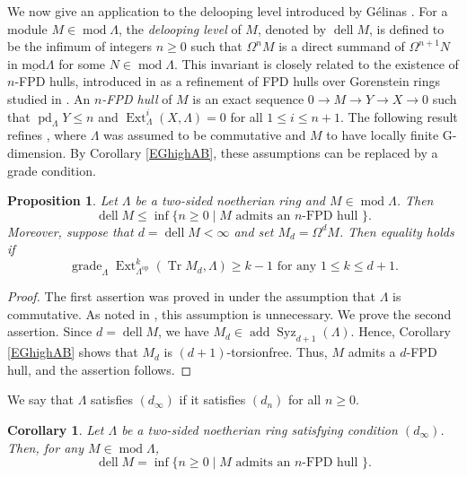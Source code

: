 \documentclass{amsart}
\newtheorem{prop}[thm]{Proposition}
\newtheorem{cor}[thm]{Corollary}
\theoremstyle{definition}
\theoremstyle{remark}
\numberwithin{equation}{thm}
\def\add{\operatorname{add}}
\def\dell{\operatorname{dell}}
\def\Ext{\operatorname{Ext}}
\def\ge{\geqslant}
\def\grade{\operatorname{grade}}
\def\le{\leqslant}
\def\lmod{\operatorname{\underline{mod}}}
\def\mod{\operatorname{mod}}
\def\pd{\operatorname{pd}}
\def\syz{\Omega}
\def\Syz{\operatorname{Syz}}
\def\tr{\operatorname{Tr}}
\begin{document}
We now give an application to the delooping level introduced by Gélinas \cite{Gel}. For a module $M\in\mod\Lambda$, the {\em delooping level} of $M$, denoted by $\dell M$, is defined to be the infimum of integers $n\ge0$ such that $\syz^n M$ is a direct summand of $\syz^{n+1}N$ in $\lmod\Lambda$ for some $N\in\mod\Lambda$. This invariant is closely related to the existence of $n$-FPD hulls, introduced in \cite{OExt, OMart} as a refinement of FPD hulls over Gorenstein rings studied in \cite{ABu}. An {\em $n$-FPD hull} of $M$ is an exact sequence $0\to M\to Y\to X\to0$ such that $\pd_\Lambda Y\le n$ and $\Ext^i_\Lambda(X,\Lambda)=0$ for all $1\le i\le n+1$. The following result refines \cite[Theorem 1.3]{OExt}, where $\Lambda$ was assumed to be commutative and $M$ to have locally finite G-dimension. By Corollary \ref{EGhighAB}, these assumptions can be replaced by a grade condition.

\begin{prop}\label{deloop}
Let $\Lambda$ be a two-sided noetherian ring and $M\in\mod\Lambda$. Then
$$
\dell M\le\inf\{n\ge0\mid M\text{ admits an }n\text{-FPD hull }\}.
$$
Moreover, suppose that $d=\dell M<\infty$ and set $M_d=\syz^d M$.
Then equality holds if
$$
\grade_\Lambda\Ext^k_{\Lambda^{\mathrm{op}}}(\tr M_d,\Lambda)\ge k-1\text{ for any }1\le k\le d+1.
$$
\end{prop}

\begin{proof}
The first assertion was proved in \cite[Theorem 2.3]{OExt} under the assumption that $\Lambda$ is commutative. As noted in \cite[Remark 3.11(2)]{OMart}, this assumption is unnecessary. We prove the second assertion. Since $d=\dell M$, we have $M_d\in\add\Syz_{d+1}(\Lambda)$. Hence, Corollary \ref{EGhighAB} shows that $M_d$ is $(d+1)$-torsionfree. Thus, $M$ admits a $d$-FPD hull, and the assertion follows.
\end{proof}
We say that $\Lambda$ satisfies $(d_\infty)$ if it satisfies $(d_n)$ for all $n\ge0$.
\begin{cor}\label{deloop2}
Let $\Lambda$ be a two-sided noetherian ring satisfying condition $(d_\infty)$. Then, for any $M\in\mod\Lambda$,
$$
\dell M=\inf\{n\ge0\mid M\text{ admits an }n\text{-FPD hull }\}.
$$
\end{cor}

\end{document}
